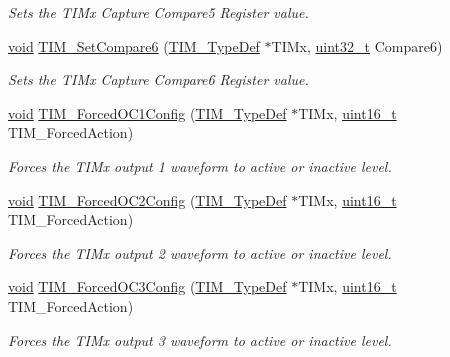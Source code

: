 \begin{DoxyCompactItemize}
\begin{DoxyCompactList}\small\item\em Sets the T\-I\-Mx Capture Compare5 Register value. \end{DoxyCompactList}\item 
\hyperlink{group___n_a_m_e_ga18028b8badbf1ea7e704ccac3c488e82}{void} \hyperlink{group___t_i_m___group2_ga31d5f0a64af39e0765a3b0680352fbfe}{T\-I\-M\-\_\-\-Set\-Compare6} (\hyperlink{struct_t_i_m___type_def}{T\-I\-M\-\_\-\-Type\-Def} $\ast$T\-I\-Mx, \hyperlink{stdint_8h_a435d1572bf3f880d55459d9805097f62}{uint32\-\_\-t} Compare6)
\begin{DoxyCompactList}\small\item\em Sets the T\-I\-Mx Capture Compare6 Register value. \end{DoxyCompactList}\item 
\hyperlink{group___n_a_m_e_ga18028b8badbf1ea7e704ccac3c488e82}{void} \hyperlink{group___t_i_m___group2_ga4f58c12e6493a0d8b9555c9097b831d6}{T\-I\-M\-\_\-\-Forced\-O\-C1\-Config} (\hyperlink{struct_t_i_m___type_def}{T\-I\-M\-\_\-\-Type\-Def} $\ast$T\-I\-Mx, \hyperlink{stdint_8h_a273cf69d639a59973b6019625df33e30}{uint16\-\_\-t} T\-I\-M\-\_\-\-Forced\-Action)
\begin{DoxyCompactList}\small\item\em Forces the T\-I\-Mx output 1 waveform to active or inactive level. \end{DoxyCompactList}\item 
\hyperlink{group___n_a_m_e_ga18028b8badbf1ea7e704ccac3c488e82}{void} \hyperlink{group___t_i_m___group2_ga3d2902b6fbab8dd55cd531055ffcc63d}{T\-I\-M\-\_\-\-Forced\-O\-C2\-Config} (\hyperlink{struct_t_i_m___type_def}{T\-I\-M\-\_\-\-Type\-Def} $\ast$T\-I\-Mx, \hyperlink{stdint_8h_a273cf69d639a59973b6019625df33e30}{uint16\-\_\-t} T\-I\-M\-\_\-\-Forced\-Action)
\begin{DoxyCompactList}\small\item\em Forces the T\-I\-Mx output 2 waveform to active or inactive level. \end{DoxyCompactList}\item 
\hyperlink{group___n_a_m_e_ga18028b8badbf1ea7e704ccac3c488e82}{void} \hyperlink{group___t_i_m___group2_ga920b0fb4ca44fceffd1c3e441feebd8f}{T\-I\-M\-\_\-\-Forced\-O\-C3\-Config} (\hyperlink{struct_t_i_m___type_def}{T\-I\-M\-\_\-\-Type\-Def} $\ast$T\-I\-Mx, \hyperlink{stdint_8h_a273cf69d639a59973b6019625df33e30}{uint16\-\_\-t} T\-I\-M\-\_\-\-Forced\-Action)
\begin{DoxyCompactList}\small\item\em Forces the T\-I\-Mx output 3 waveform to active or inactive level. \end{DoxyCompactList}\item 

\end{DoxyCompactItemize}
